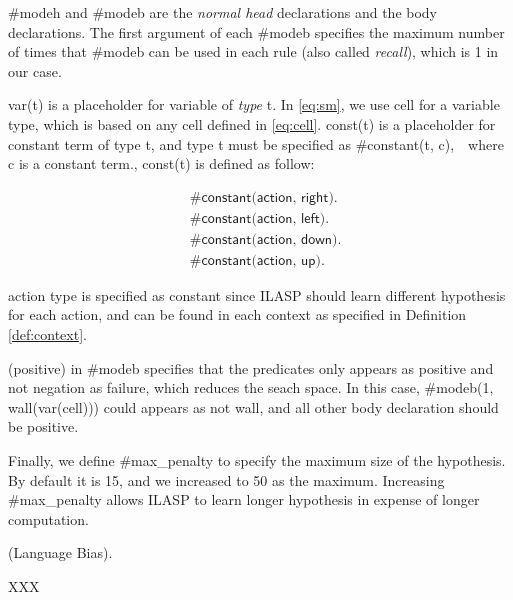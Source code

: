 \textsf{\#modeh} and \textsf{\#modeb} are the \textit{normal head} declarations and the body declarations. 
The first argument of each \textsf{\#modeb} specifies the maximum number of times that \textsf{\#modeb} can be used in each rule (also called \textit{recall}), which is 1 in our case.  

\textsf{var(t)} is a placeholder for variable of \textit{type} \textsf{t}. In \ref{eq:sm}, we use \textsf{cell} for a variable type, which is based on any cell defined in \ref{eq:cell}.
\textsf{const(t)} is a placeholder for constant term of type \textsf{t}, and type \textsf{t} must be specified as \textsf{\#constant(t, c)},　where \textsf{c} is a constant term., 
const(t) is defined as follow:

\begin{equation}
\begin{split}
&\textsf{\#constant(action, right).}\\
&\textsf{\#constant(action, left).}\\
&\textsf{\#constant(action, down).}\\
&\textsf{\#constant(action, up).}
\end{split}
\end{equation}

\textsf{action} type is specified as constant since ILASP should learn different hypothesis for each action, and can be found in each context as specified in Definition \ref{def:context}.

\textsf{(positive)} in \textsf{\#modeb} specifies that the predicates only appears as positive and not negation as failure, which reduces the seach space. 
In this case, \textsf{\#modeb(1, wall(var(cell)))} could appears as \textsf{not wall}, and all other body declaration should be positive. 

Finally, we define \textsf{\#max\_penalty} to specify the maximum size of the hypothesis. By default it is 15, and we increased to 50 as the maximum.
Increasing \#max\_penalty allows ILASP to learn longer hypothesis in expense of longer computation.
\begin{examp} \normalfont (Language Bias).

XXX
\end{examp}
    
